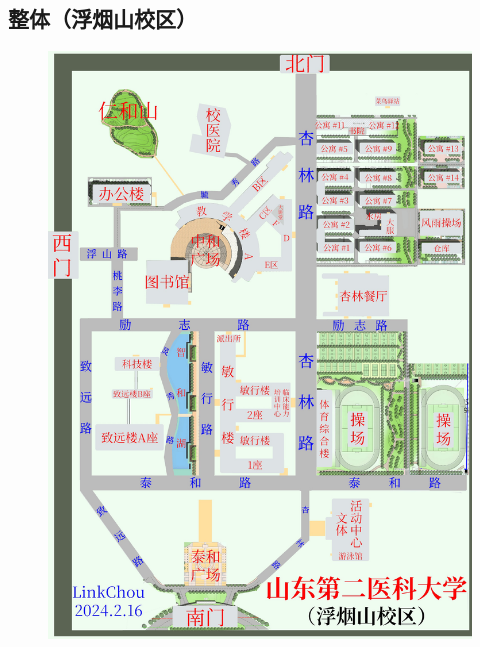 \subsection[整体（浮烟山校区）]{整体（浮烟山校区）}
\noindent\begin{figure}[H]
    \centering
    \vspace{1em}
    \noindent\includegraphics*[width=.99\linewidth]{resources/map/浮烟山校区整体地图.pdf}
    \label{map_fuyanshan_holistic}
\end{figure}

\newpage
